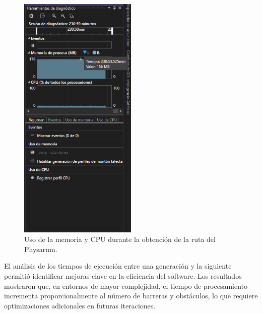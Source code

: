     \begin{figure}[htbp]
        \centering
        \includegraphics[width=0.5\textwidth]{./images/Pruebas/simulador/image086.png}
        \caption{Uso de la memoria y CPU durante la obtenci\'on de la ruta del Physarum.}
        \label{fig:Ruta 86}
    \end{figure}
    \vskip 0.5cm
    El an\'alisis de los tiempos de ejecuci\'on entre una generaci\'on
        y la siguiente permiti\'o identificar mejoras clave en la
        eficiencia del software. Los resultados mostraron que, en
        entornos de mayor complejidad, el tiempo de procesamiento
        incrementa proporcionalmente al n\'umero de barreras y
        obst\'aculos, lo que requiere optimizaciones adicionales en
        futuras iteraciones.